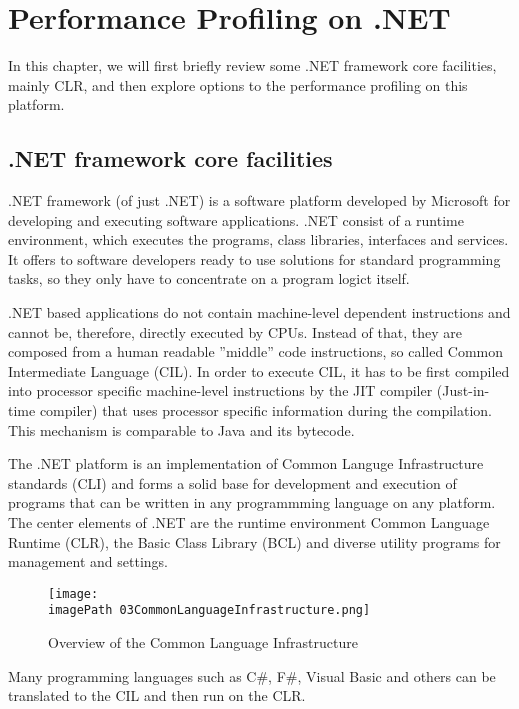 \chapter{Performance Profiling on .NET}

In this chapter, we will first briefly review some .NET framework core facilities, mainly CLR, and then explore options to the performance profiling on this platform. 

\section{.NET framework core facilities}
.NET framework (of just .NET) is a software platform developed by Microsoft for developing and executing software applications. .NET  consist of a runtime environment, which executes the programs, class libraries, interfaces and services. It offers to software developers ready to use solutions for standard programming tasks, so they only have to concentrate on a program logict itself.

.NET based applications do not contain machine-level dependent instructions and cannot be, therefore, directly executed by CPUs. Instead of that, they are composed from a human readable ''middle'' code instructions, so called Common Intermediate Language (CIL). In order to execute CIL, it has to be first compiled into processor specific machine-level instructions by the JIT compiler (Just-in-time compiler) that uses processor specific information during the compilation. This mechanism is comparable to Java and its bytecode.

The .NET platform is an implementation of Common Languge Infrastructure standards (CLI) and forms a solid base for development and execution of programs that can be written in any programmming language on any platform. The center elements of .NET are the runtime environment Common Language Runtime (CLR), the Basic Class Library (BCL) and diverse utility programs for management and settings.

\begin{figure}
	\centering
		\texttt{[image: \\imagePath 03CommonLanguageInfrastructure.png]}
		\caption{Overview of the Common Language Infrastructure \cite{OCLI} }
	\label{fig:03CommonLanguageInfrastructure}
\end{figure}

Many programming languages such as C\#, F\#, Visual Basic and others can be translated to the CIL and then run on the CLR. 


